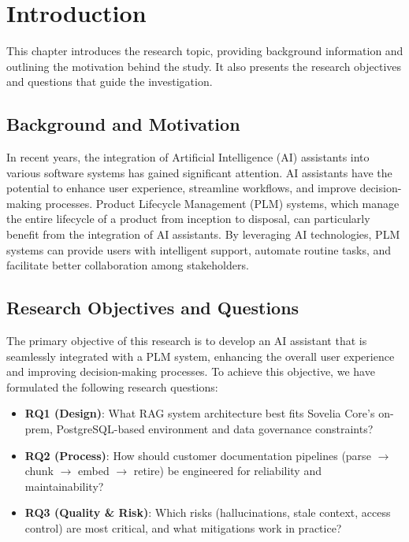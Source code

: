 \chapter{Introduction}
\label{ch:introduction}

This chapter introduces the research topic, providing background information and outlining the motivation behind the study. It also presents the research objectives and questions that guide the investigation.

\section{Background and Motivation}
\label{sec:background-and-motivation}

In recent years, the integration of Artificial Intelligence (AI) assistants into various software systems has gained significant attention. AI assistants have the potential to enhance user experience, streamline workflows, and improve decision-making processes. Product Lifecycle Management (PLM) systems, which manage the entire lifecycle of a product from inception to disposal, can particularly benefit from the integration of AI assistants. By leveraging AI technologies, PLM systems can provide users with intelligent support, automate routine tasks, and facilitate better collaboration among stakeholders.

\section{Research Objectives and Questions}
\label{sec:research-objectives-and-questions}

The primary objective of this research is to develop an AI assistant that is seamlessly integrated with a PLM system, enhancing the overall user experience and improving decision-making processes. To achieve this objective, we have formulated the following research questions:

\begin{itemize}
	\item \textbf{RQ1 (Design)}: What RAG system architecture best fits Sovelia Core's on-prem, PostgreSQL-based environment and data governance constraints?
	\item \textbf{RQ2 (Process)}: How should customer documentation pipelines (parse $ \rightarrow $ chunk $ \rightarrow $ embed $ \rightarrow $ retire) be engineered for reliability and maintainability?
	\item \textbf{RQ3 (Quality \& Risk)}: Which risks (hallucinations, stale context, access control) are most critical, and what mitigations work in practice?
\end{itemize}

